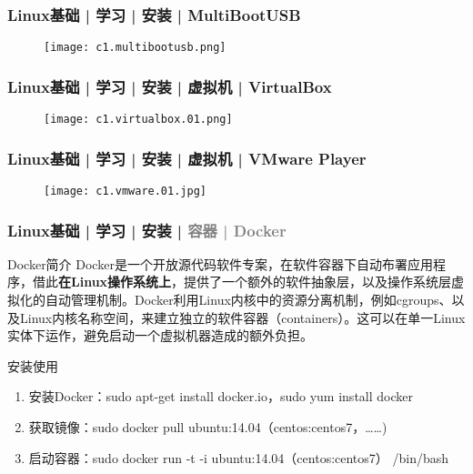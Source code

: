 \begin{frame}
  \frametitle{Linux基础 | 学习 | 安装 | MultiBootUSB}
  \begin{figure}
    \centering
    \texttt{[image: c1.multibootusb.png]}
  \end{figure}
\end{frame}

\begin{frame}
  \frametitle{Linux基础 | 学习 | 安装 | 虚拟机 | VirtualBox}
  \begin{figure}
    \centering
    \texttt{[image: c1.virtualbox.01.png]}
  \end{figure}
\end{frame}

\begin{frame}
  \frametitle{Linux基础 | 学习 | 安装 | 虚拟机 | VMware Player}
  \begin{figure}
    \centering
    \texttt{[image: c1.vmware.01.jpg]}
  \end{figure}
\end{frame}

\begin{frame}
  \frametitle{Linux基础 | 学习 | 安装 | \textcolor{gray}{容器 | Docker}}
  \begin{block}{Docker简介}
    Docker是一个开放源代码软件专案，在软件容器下自动布署应用程序，借此\textbf{在Linux操作系统上}，提供了一个额外的软件抽象层，以及操作系统层虚拟化的自动管理机制。Docker利用Linux内核中的资源分离机制，例如cgroups、以及Linux内核名称空间，来建立独立的软件容器（containers）。这可以在单一Linux实体下运作，避免启动一个虚拟机器造成的额外负担。
  \end{block}
  \pause
  \begin{block}{安装使用}
    \begin{enumerate}
      \item 安装Docker：sudo apt-get install docker.io，sudo yum install docker
      \item 获取镜像：sudo docker pull ubuntu:14.04（centos:centos7，……)
      \item 启动容器：sudo docker run -t -i ubuntu:14.04（centos:centos7） /bin/bash
    \end{enumerate}
  \end{block}
\end{frame}

